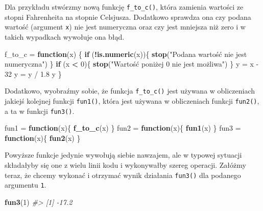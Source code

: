 \documentclass[paper=6in:9in,pagesize=pdftex,headinclude=on,footinclude=on,10pt]{scrbook}
\newenvironment{Shaded}{\begin{snugshade}}{\end{snugshade}}
\newcommand{\CommentTok}[1]{\textcolor[rgb]{0.56,0.35,0.01}{\textit{#1}}}
\newcommand{\ControlFlowTok}[1]{\textcolor[rgb]{0.13,0.29,0.53}{\textbf{#1}}}
\newcommand{\DecValTok}[1]{\textcolor[rgb]{0.00,0.00,0.81}{#1}}
\newcommand{\KeywordTok}[1]{\textcolor[rgb]{0.13,0.29,0.53}{\textbf{#1}}}
\newcommand{\NormalTok}[1]{#1}
\newcommand{\OperatorTok}[1]{\textcolor[rgb]{0.81,0.36,0.00}{\textbf{#1}}}
\newcommand{\StringTok}[1]{\textcolor[rgb]{0.31,0.60,0.02}{#1}}
\begin{document}
Dla przykładu stwórzmy nową funkcję \texttt{f\_to\_c()}, która zamienia wartości ze stopni Fahrenheita na stopnie Celsjusza.
Dodatkowo sprawdza ona czy podana wartość (argument \texttt{x}) nie jest numeryczna oraz czy jest mniejsza niż zero i w takich wypadkach wywołuje ona błąd.

\begin{Shaded}
\begin{Highlighting}[]
\NormalTok{f_to_c =}\StringTok{ }\ControlFlowTok{function}\NormalTok{(x) \{}
  \ControlFlowTok{if}\NormalTok{ (}\OperatorTok{!}\KeywordTok{is.numeric}\NormalTok{(x))\{}
    \KeywordTok{stop}\NormalTok{(}\StringTok{"Podana wartość nie jest numeryczna"}\NormalTok{)}
\NormalTok{  \}}
  \ControlFlowTok{if}\NormalTok{ (x }\OperatorTok{<}\StringTok{ }\DecValTok{0}\NormalTok{)\{}
    \KeywordTok{stop}\NormalTok{(}\StringTok{"Wartość poniżej 0 nie jest możliwa")}
\StringTok{  \}}
\StringTok{  y = x - 32}
\StringTok{  y = y / 1.8}
\StringTok{  y}
\StringTok{\}}
\end{Highlighting}
\end{Shaded}

Dodatkowo, wyobraźmy sobie, że funkcja \texttt{f\_to\_c()} jest używana w obliczeniach jakiejś kolejnej funkcji \texttt{fun1()}, która jest używana w obliczeniach funkcji \texttt{fun2()}, a ta w funkcji \texttt{fun3()}.

\begin{Shaded}
\begin{Highlighting}[]
\NormalTok{fun1 =}\StringTok{ }\ControlFlowTok{function}\NormalTok{(x)\{}
  \KeywordTok{f_to_c}\NormalTok{(x)}
\NormalTok{\}}
\NormalTok{fun2 =}\StringTok{ }\ControlFlowTok{function}\NormalTok{(x)\{}
  \KeywordTok{fun1}\NormalTok{(x)}
\NormalTok{\}}
\NormalTok{fun3 =}\StringTok{ }\ControlFlowTok{function}\NormalTok{(x)\{}
  \KeywordTok{fun2}\NormalTok{(x)}
\NormalTok{\}}
\end{Highlighting}
\end{Shaded}

Powyższe funkcje jedynie wywołują siebie nawzajem, ale w typowej sytuacji składałyby się one z wielu linii kodu i wykonywałby szereg operacji.
Załóżmy teraz, że chcemy wykonać i otrzymać wynik działania \texttt{fun3()} dla podanego argumentu \texttt{1}.

\begin{Shaded}
\begin{Highlighting}[]
\KeywordTok{fun3}\NormalTok{(}\DecValTok{1}\NormalTok{)}
\CommentTok{#> [1] -17.2}
\end{Highlighting}
\end{Shaded}
\end{document}
